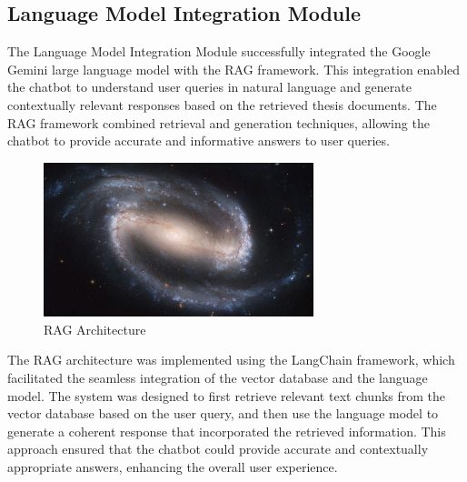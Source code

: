 \begin{refsection}
\subsection{Language Model Integration Module}
The Language Model Integration Module successfully integrated the Google Gemini large language model with the RAG framework. This integration enabled the chatbot to understand user queries in natural language and generate contextually relevant responses based on the retrieved thesis documents. The RAG framework combined retrieval and generation techniques, allowing the chatbot to provide accurate and informative answers to user queries.
\begin{figure}[h]
    \centering
    \includegraphics[width=0.7\textwidth]{figures/sampleFig1.jpg}
    \caption{RAG Architecture}
\end{figure}
The RAG architecture was implemented using the LangChain framework, which facilitated the seamless integration of the vector database and the language model. The system was designed to first retrieve relevant text chunks from the vector database based on the user query, and then use the language model to generate a coherent response that incorporated the retrieved information. This approach ensured that the chatbot could provide accurate and contextually appropriate answers, enhancing the overall user experience.


\end{refsection}
